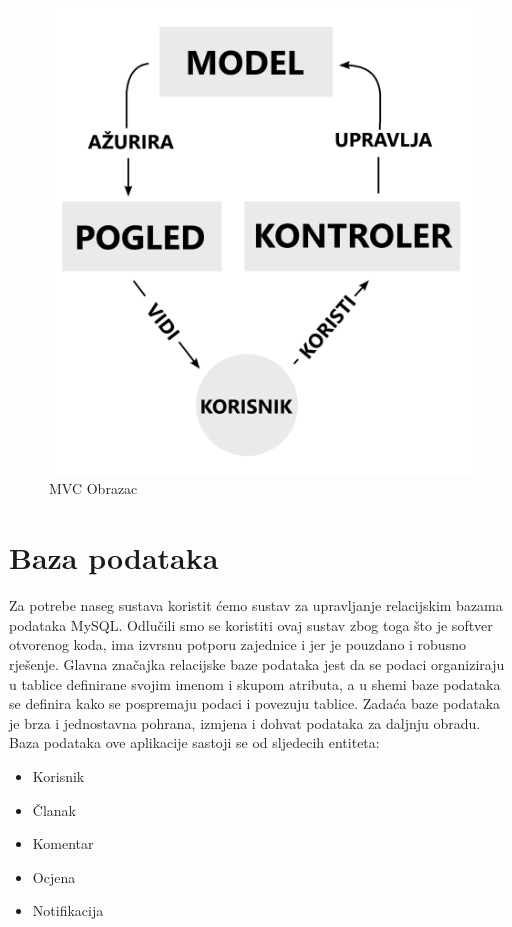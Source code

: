 \begin{figure}[H]
	\includegraphics[scale=0.2]{slike/MVCObrazac.PNG}
	\centering
	\caption{MVC Obrazac}
	\label{fig:mvc_obrazac}
\end{figure}

\eject


\section{Baza podataka}

Za potrebe naseg sustava koristit ćemo sustav za upravljanje relacijskim bazama podataka MySQL.
Odlučili smo se koristiti ovaj sustav zbog toga što je softver otvorenog koda, ima izvrsnu potporu zajednice i jer je pouzdano i robusno rješenje.
Glavna značajka relacijske baze podataka jest da se podaci organiziraju u tablice definirane svojim imenom i skupom atributa, a u shemi baze podataka se definira kako se 				pospremaju podaci i povezuju tablice.
Zadaća baze podataka je brza i jednostavna pohrana, izmjena i dohvat podataka za daljnju obradu.
Baza podataka ove aplikacije sastoji se od sljedecih entiteta: 
\begin{itemize}
	\item Korisnik
	\item Članak
	\item Komentar
	\item Ocjena
	\item Notifikacija
\end{itemize}

